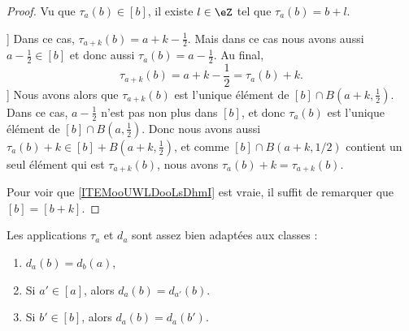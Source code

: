 \begin{proof}
	Vu que \( \tau_a(b)\in [b]\), il existe \( l\in \eZ\) tel que \( \tau_a(b)=b+l\).
	\begin{subproof}
		\spitem[\( a+k-\frac{ 1 }{2}\in [b]\)]
		Dans ce cas, \( \tau_{a+k}(b)=a+k-\frac{ 1 }{2}\). Mais dans ce cas nous avons aussi \( a-\frac{ 1 }{2}\in [b]\) et donc aussi \( \tau_a(b)=a-\frac{ 1 }{2}\). Au final,
		\begin{equation}
			\tau_{a+k}(b)=a+k-\frac{ 1 }{2}=\tau_a(b)+k.
		\end{equation}
		\spitem[Si \( a+k-1/2\) n'est pas dans \( [b]\)]
		Nous avons alors que \( \tau_{a+k}(b)\) est l'unique élément de \( [b]\cap B(a+k,\frac{ 1 }{2})\). Dans ce cas, \( a-\frac{ 1 }{2}\) n'est pas non plus dans \( [b]\), et donc \( \tau_a(b)\) est l'unique élément de \( [b]\cap B(a,\frac{ 1 }{2})\). Donc nous avons aussi \( \tau_a(b)+k\in [b]+B(a+k,\frac{ 1 }{2})\), et comme \( [b]\cap B(a+k,1/2)\) contient un seul élément qui est \( \tau_{a+k}(b)\), nous avons \( \tau_a(b)+k=\tau_{a+k}(b)\).
	\end{subproof}

	Pour voir que \ref{ITEMooUWLDooLsDhmI} est vraie, il suffit de remarquer que \( [b]=[b+k]\).
\end{proof}

\begin{lemma}	\label{LEMooSCXBooVXlqpp}
	Les applications \( \tau_a\) et \( d_a\) sont assez bien adaptées aux classes :
	\begin{enumerate}
		\item		\label{ITEMooLYTMooUdTFWw}
		      \( d_a(b)=d_b(a)\),
		\item	\label{ITEMooEIGSooQXMNYq}
		      Si \( a'\in [a]\), alors \( d_a(b)=d_{a'}(b)\).
		\item		\label{ITEMooVLHWooVGQSKU}
		      Si \( b'\in [b]\), alors \( d_a(b)=d_a(b')\).
	\end{enumerate}
\end{lemma}

